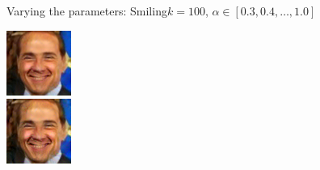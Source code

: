 \documentclass[11pt]{beamer}
\begin{document}
\begin{frame}{Varying the parameters: Smiling}{$k=100$, $\alpha \in [0.3, 0.4, \dots, 1.0]$}
\begin{minipage}{81px}
	\end{minipage}%
	\begin{minipage}{81px}
		\includegraphics[width=80px]{../pictures/outputs/alpha_k/Smiling/k100/Silvio_Berlusconi_0023_alpha-0.6_k-1002017-02-07_15-19-24.png}\\
		\includegraphics[width=80px]{../pictures/outputs/alpha_k/Smiling/k100/Silvio_Berlusconi_0023_alpha-1.0_k-1002017-02-07_17-20-40.png}
	\end{minipage}
\end{frame}
\end{document}
